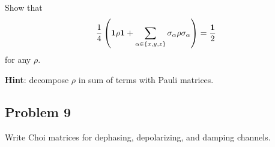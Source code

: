 \documentclass[a4paper,10pt]{article}
\begin{document}
Show that 
\begin{equation}
	\frac{1}{4}\left({\bf 1}\rho{\bf 1}+\sum_{\alpha\in\{x,y,z\}}\sigma_{\alpha}\rho\sigma_{\alpha}\right) = \frac{\bf 1}{2}
\end{equation}
for any $\rho$.

{\bf Hint}: decompose $\rho$ in sum of terms with Pauli matrices.


\subsection*{Problem 9}
Write Choi matrices for dephasing, depolarizing, and damping channels.
\end{document}
